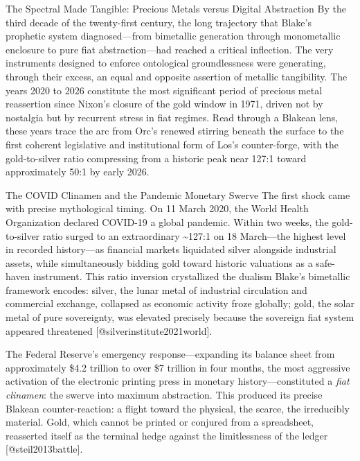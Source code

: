 \documentclass[
  ignorenonframetext,
]{beamer}
\author{\texorpdfstring{}{}}
\date{}
\begin{document}
\begin{frame}{The Spectral Made Tangible: Precious Metals versus Digital
Abstraction}
\protect{}\label{sec-spectral-2020-2026}
By the third decade of the twenty-first century, the long trajectory
that Blake's prophetic system diagnosed---from bimetallic generation
through monometallic enclosure to pure fiat abstraction---had reached a
critical inflection. The very instruments designed to enforce
ontological groundlessness were generating, through their excess, an
equal and opposite assertion of metallic tangibility. The years 2020 to
2026 constitute the most significant period of precious metal
reassertion since Nixon's closure of the gold window in 1971, driven not
by nostalgia but by recurrent stress in fiat regimes. Read through a
Blakean lens, these years trace the arc from Orc's renewed stirring
beneath the surface to the first coherent legislative and institutional
form of Los's counter-forge, with the gold-to-silver ratio compressing
from a historic peak near 127:1 toward approximately 50:1 by early 2026.

\begin{block}{The COVID Clinamen and the Pandemic Monetary Swerve}
\protect{}\label{the-covid-clinamen-and-the-pandemic-monetary-swerve}
The first shock came with precise mythological timing. On 11 March 2020,
the World Health Organization declared COVID-19 a global pandemic.
Within two weeks, the gold-to-silver ratio surged to an extraordinary
\textasciitilde127:1 on 18 March---the highest level in recorded
history---as financial markets liquidated silver alongside industrial
assets, while simultaneously bidding gold toward historic valuations as
a safe-haven instrument. This ratio inversion crystallized the dualism
Blake's bimetallic framework encodes: silver, the lunar metal of
industrial circulation and commercial exchange, collapsed as economic
activity froze globally; gold, the solar metal of pure sovereignty, was
elevated precisely because the sovereign fiat system appeared threatened
{[}@silverinstitute2021world{]}.

The Federal Reserve's emergency response---expanding its balance sheet
from approximately \$4.2 trillion to over \$7 trillion in four months,
the most aggressive activation of the electronic printing press in
monetary history---constituted a \emph{fiat clinamen}: the swerve into
maximum abstraction. This produced its precise Blakean counter-reaction:
a flight toward the physical, the scarce, the irreducibly material.
Gold, which cannot be printed or conjured from a spreadsheet, reasserted
itself as the terminal hedge against the limitlessness of the ledger
{[}@steil2013battle{]}.


\end{block}
\end{frame}
\end{document}
